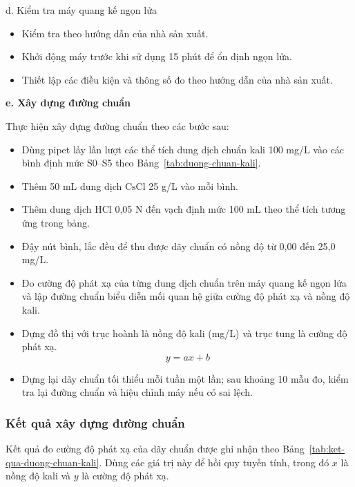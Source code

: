 d. Kiểm tra máy quang kế ngọn lửa
\begin{itemize}
  \item Kiểm tra theo hướng dẫn của nhà sản xuất.
  \item Khởi động máy trước khi sử dụng 15 phút để ổn định ngọn lửa.
  \item Thiết lập các điều kiện và thông số đo theo hướng dẫn của nhà sản xuất.
\end{itemize}

\noindent\textbf{e. Xây dựng đường chuẩn}\par



Thực hiện xây dựng đường chuẩn theo các bước sau:
\begin{itemize}
  \item Dùng pipet lấy lần lượt các thể tích dung dịch chuẩn kali 100 mg/L vào các bình định mức S0--S5 theo Bảng~\ref{tab:duong-chuan-kali}.
  \item Thêm 50 mL dung dịch \(\mathrm{CsCl}\) 25 g/L vào mỗi bình.
  \item Thêm dung dịch \(\mathrm{HCl}\) 0,05 N đến vạch định mức 100 mL theo thể tích tương ứng trong bảng.
  \item Đậy nút bình, lắc đều để thu được dãy chuẩn có nồng độ từ 0,00 đến 25,0 mg/L.
  \item Đo cường độ phát xạ của từng dung dịch chuẩn trên máy quang kế ngọn lửa và lập đường chuẩn biểu diễn mối quan hệ giữa cường độ phát xạ và nồng độ kali.
  \item Dựng đồ thị với trục hoành là nồng độ kali (mg/L) và trục tung là cường độ phát xạ.
  \[
    y = ax + b
  \]
  \item Dựng lại dãy chuẩn tối thiểu mỗi tuần một lần; sau khoảng 10 mẫu đo, kiểm tra lại đường chuẩn và hiệu chỉnh máy nếu có sai lệch.
\end{itemize}

\subsubsection{Kết quả xây dựng đường chuẩn}
Kết quả đo cường độ phát xạ của dãy chuẩn được ghi nhận theo Bảng~\ref{tab:ket-qua-duong-chuan-kali}. Dùng các giá trị này để hồi quy tuyến tính, trong đó $x$ là nồng độ kali và $y$ là cường độ phát xạ.





